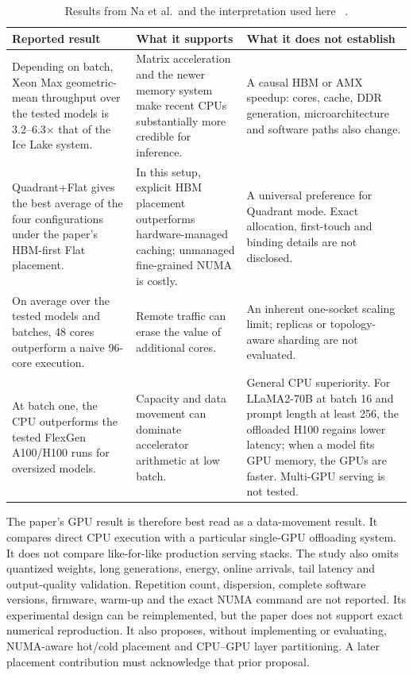 \begin{table}[H]
\centering
\small
\caption{Results from Na et al.\ and the interpretation used here
~\cite{na2024llmcpu}.}
\label{tab:na-findings}
\begin{tabularx}{\textwidth}{@{}YYY@{}}
\toprule
\textbf{Reported result} & \textbf{What it supports}
 & \textbf{What it does not establish} \\
\midrule
Depending on batch, Xeon Max geometric-mean throughput over the tested
models is 3.2--6.3$\times$ that of the Ice Lake system.
 & Matrix acceleration and the newer memory system make recent CPUs
   substantially more credible for inference.
 & A causal HBM or AMX speedup: cores, cache, DDR generation,
   microarchitecture and software paths also change. \\
\addlinespace[2pt]
Quadrant+Flat gives the best average of the four configurations under
the paper's HBM-first Flat placement.
 & In this setup, explicit HBM placement outperforms hardware-managed
   caching; unmanaged fine-grained NUMA is costly.
 & A universal preference for Quadrant mode.  Exact allocation,
   first-touch and binding details are not disclosed. \\
\addlinespace[2pt]
On average over the tested models and batches, 48 cores outperform a
naive 96-core execution.
 & Remote traffic can erase the value of additional cores.
 & An inherent one-socket scaling limit; replicas or topology-aware
   sharding are not evaluated. \\
\addlinespace[2pt]
At batch one, the CPU outperforms the tested FlexGen A100/H100 runs for
oversized models.
 & Capacity and data movement can dominate accelerator arithmetic at
   low batch.
 & General CPU superiority.  For LLaMA2-70B at batch 16 and prompt
   length at least 256, the offloaded H100 regains lower latency; when a
   model fits GPU memory, the GPUs are faster.  Multi-GPU serving is not
   tested. \\
\bottomrule
\end{tabularx}
\end{table}

The paper's GPU result is therefore best read as a data-movement result.
It compares direct CPU execution with a particular single-GPU
offloading system.  It does not compare like-for-like production
serving stacks.  The study also omits quantized weights, long
generations, energy, online arrivals, tail latency and output-quality
validation.  Repetition count, dispersion, complete software versions,
firmware, warm-up and the exact NUMA command are not reported.  Its
experimental design can be reimplemented, but the paper does not
support exact numerical reproduction.  It also proposes, without
implementing or evaluating, NUMA-aware hot/cold placement and
CPU--GPU layer partitioning.  A later placement contribution must
acknowledge that prior proposal.

